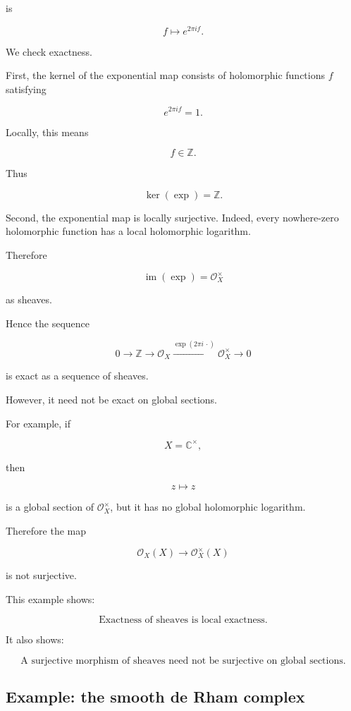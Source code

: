 \documentclass[12pt,a4paper]{article}
\DeclareMathOperator{\im}{im}
\theoremstyle{notespace}
\newcommand{\Ocal}{\mathcal O}
\begin{document}
	is
	
	\[
	f\mapsto e^{2\pi i f}.
	\]
	
	We check exactness.
	
	First, the kernel of the exponential map consists of holomorphic functions
	$f$ satisfying
	
	\[
	e^{2\pi i f}=1.
	\]
	
	Locally, this means
	
	\[
	f\in \mathbb Z.
	\]
	
	Thus
	
	\[
	\ker(\exp)=\mathbb Z.
	\]
	
	Second, the exponential map is locally surjective. Indeed, every nowhere-zero
	holomorphic function has a local holomorphic logarithm.
	
	Therefore
	
	\[
	\im(\exp)=\Ocal_X^\times
	\]
	
	as sheaves.
	
	Hence the sequence
	
	\[
	0
	\longrightarrow
	\mathbb Z
	\longrightarrow
	\Ocal_X
	\xrightarrow{\exp(2\pi i\,\cdot)}
	\Ocal_X^\times
	\longrightarrow
	0
	\]
	
	is exact as a sequence of sheaves.
	
	However, it need not be exact on global sections.
	
	For example, if
	
	\[
	X=\mathbb C^\times,
	\]
	
	then
	
	\[
	z\mapsto z
	\]
	
	is a global section of $\Ocal_X^\times$, but it has no global holomorphic
	logarithm.
	
	Therefore the map
	
	\[
	\Ocal_X(X)\to \Ocal_X^\times(X)
	\]
	
	is not surjective.
	
	This example shows:
	
	\[
	\boxed{
		\text{Exactness of sheaves is local exactness.}
	}
	\]
	
	It also shows:
	
	\[
	\boxed{
		\text{A surjective morphism of sheaves need not be surjective on global sections.}
	}
	\]
	
	\subsection{Example: the smooth de Rham complex}
	
\end{document}
